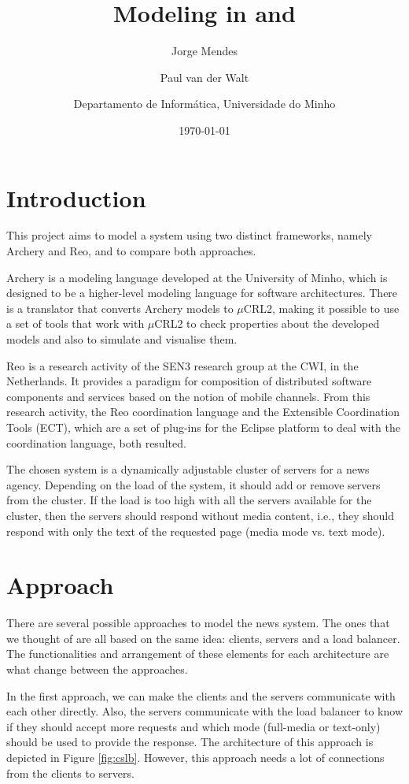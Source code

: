 \documentclass[a4paper]{article}
\author{Jorge Mendes \and Paul van der Walt \and \small{Departamento de Inform\'atica, Universidade do Minho}}
\date{\today}
\title{Modeling in \ar and \re}
\newcommand{\ar}{Archery\xspace}
\newcommand{\re}{Reo\xspace}
\newcommand{\mcrl}{$\mu$CRL2\xspace}
\begin{document}
\maketitle

%
%
\section{Introduction}

This project aims to model a system using two distinct frameworks, namely \ar
and \re, and to compare both approaches.

\ar is a modeling language developed at the University of Minho, which is designed
to be a higher-level modeling language for software architectures. There is a translator
that converts \ar models to \mcrl, making it possible to use a set of tools that work with
\mcrl to check properties about the developed models and also to simulate and visualise them.

\re is a research activity of the SEN3 research group at the CWI, in the
Netherlands. It provides a paradigm for composition of distributed software
components and services based on the notion of mobile channels.
From this research activity,  the \re coordination language and the
Extensible Coordination Tools (ECT), which are a set of plug-ins for the Eclipse
platform to deal with the coordination language, both resulted.

The chosen system is a dynamically adjustable cluster of servers for a news
agency. Depending on the load of the system, it should add or remove servers
from the cluster. If the load is too high with all the servers available for
the cluster, then the servers should respond without media content, i.e., they
should respond with only the text of the requested page (media mode vs. text
mode).



%
%
\section{Approach}

There are several possible approaches to model the news system. The ones that we
thought of are all based on the same idea: clients, servers and a load balancer. The
functionalities and arrangement of these elements for each architecture are what
change between the approaches.

In the first approach, we can make the clients and the servers communicate with
each other
directly. Also, the servers communicate with the load balancer to
know if they should accept more requests and which mode (full-media or
text-only) should be used to provide the response. The architecture of this
approach is depicted in Figure \ref{fig:cslb}. However, this approach needs
a lot of connections from the clients to servers.
\end{document}
